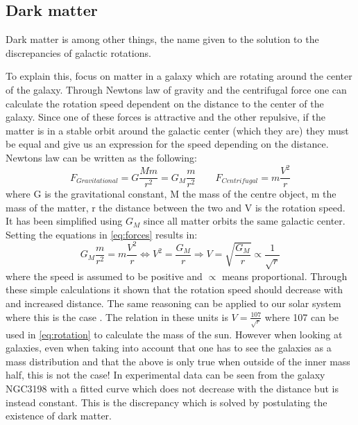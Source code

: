 \subsection{Dark matter}\label{sec:tb:subsec:dark}
Dark matter is among other things, the name given to the solution to the discrepancies of galactic rotations. 

To explain this, focus on matter in a galaxy which are rotating around the center of the galaxy. Through Newtons law of gravity and the centrifugal force one can calculate the rotation speed dependent on the distance to the center of the galaxy. Since one of these forces is attractive and the other repulsive, if the matter is in a stable orbit around the galactic center (which they are) they must be equal and give us an expression for the speed depending on the distance. Newtons law can be written as the following:
\begin{equation}\label{eq:forces}
F_{Gravitational}=G \frac{M m}{r^2} = G_M \frac{m}{r^2} \qquad F_{Centrifugal} = m\frac{V^2}{r}
\end{equation}
where G is the gravitational constant, M the mass of the centre object, m the mass of the matter, r the distance between the two and V is the rotation speed. It has been simplified using $G_M$ since all matter orbits the same galactic center. Setting the equations in \eqref{eq:forces} results in:
\begin{equation}\label{eq:rotation}
G_M \frac{m}{r^2} = m\frac{V^2}{r} \Leftrightarrow V^2 =\frac{G_M}{r} \Rightarrow V=\sqrt{\frac{G_M}{r}} \propto \frac{1}{\sqrt{r}}
\end{equation}
where the speed is assumed to be positive and $\propto$ means proportional. Through these simple calculations it shown that the rotation speed should decrease with and increased distance. The same reasoning can be applied to our solar system where this is the case . The relation in these units is $V=\frac{107}{\sqrt{r}}$ where 107 can be used in \eqref{eq:rotation} to calculate the mass of the sun. However when looking at galaxies, even when taking into account that one has to see the galaxies as a mass distribution and that the above is only true when outside of the inner mass half, this is not the case! In  experimental data can be seen from the galaxy NGC3198 with a fitted curve which does not decrease with the distance but is instead constant.  This is the discrepancy which is solved by postulating the existence of dark matter.
